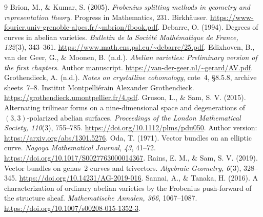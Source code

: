\documentclass[11pt]{article}
\theoremstyle{definition}\newtheorem{definition}[theorem]{Definition}
\theoremstyle{remark}\newtheorem{remark}[theorem]{Remark}
\begin{document}
\begin{thebibliography}{9}
Brion, M., \& Kumar, S. (2005). \emph{Frobenius splitting methods in geometry and representation theory}. Progress in Mathematics, 231. Birkh\"auser. \url{https://www-fourier.univ-grenoble-alpes.fr/~mbrion/fbook.pdf}.
Debarre, O. (1994). Degrees of curves in abelian varieties. \emph{Bulletin de la Soci\'et\'e Math\'ematique de France, 122}(3), 343--361. \url{https://www.math.ens.psl.eu/~debarre/25.pdf}.
Edixhoven, B., van der Geer, G., \& Moonen, B. (n.d.). \emph{Abelian varieties: Preliminary version of the first chapters}. Author manuscript. \url{https://van-der-geer.nl/~gerard/AV.pdf}.
Grothendieck, A. (n.d.). \emph{Notes on crystalline cohomology}, cote~4, \S8.5.8, archive sheets~7--8. Institut Montpelli\'erain Alexander Grothendieck. \url{https://grothendieck.umontpellier.fr/4.pdf}.
Gruson, L., \& Sam, S. V. (2015). Alternating trilinear forms on a nine-dimensional space and degenerations of $(3,3)$-polarized abelian surfaces. \emph{Proceedings of the London Mathematical Society, 110}(3), 755--785. \url{https://doi.org/10.1112/plms/pdu050}. Author version: \url{https://arxiv.org/abs/1301.5276}.
Oda, T. (1971). Vector bundles on an elliptic curve. \emph{Nagoya Mathematical Journal, 43}, 41--72. \url{https://doi.org/10.1017/S0027763000014367}.
Rains, E. M., \& Sam, S. V. (2019). Vector bundles on genus~2 curves and trivectors. \emph{Algebraic Geometry, 6}(3), 328--345. \url{https://doi.org/10.14231/AG-2019-016}.
Sannai, A., \& Tanaka, H. (2016). A characterization of ordinary abelian varieties by the Frobenius push-forward of the structure sheaf. \emph{Mathematische Annalen, 366}, 1067--1087. \url{https://doi.org/10.1007/s00208-015-1352-3}.
\end{thebibliography}
\end{document}
